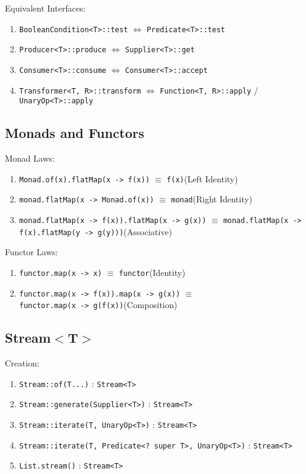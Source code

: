 \documentclass[12pt, a4paper]{article}
\begin{document}
\begin{multicols*}{2}
Equivalent Interfaces:
\begin{enumerate}[\roman*.]
  \item \lstinline|BooleanCondition<T>::test| $\iff$ \lstinline|Predicate<T>::test|
  \item \lstinline|Producer<T>::produce| $\iff$ \lstinline|Supplier<T>::get|
  \item \lstinline|Consumer<T>::consume| $\iff$ \lstinline|Consumer<T>::accept|
  \item \lstinline|Transformer<T, R>::transform| $\iff$ \lstinline|Function<T, R>::apply| /\\
    \quad\quad\quad\quad\quad\quad\quad\quad\quad\quad\quad\quad\quad\quad\quad\quad\quad\quad\quad\quad\lstinline|UnaryOp<T>::apply|
\end{enumerate}

\subsection{Monads and Functors}
Monad Laws:
\begin{enumerate}[\roman*.]
  \item \lstinline|Monad.of(x).flatMap(x -> f(x))| $\equiv$ \lstinline|f(x)|\hfill(Left Identity)
  \item \lstinline|monad.flatMap(x -> Monad.of(x))| $\equiv$ \lstinline|monad|\hfill(Right Identity)
  \item \lstinline|monad.flatMap(x -> f(x)).flatMap(x -> g(x))| $\equiv$ \lstinline|monad.flatMap(x -> f(x).flatMap(y -> g(y)))|\hfill(Associative)
\end{enumerate}

Functor Laws:
\begin{enumerate}[\roman*.]
  \item \lstinline|functor.map(x -> x)| $\equiv$ \lstinline|functor|\hfill(Identity)
  \item \lstinline|functor.map(x -> f(x)).map(x -> g(x))| $\equiv$\\ \lstinline|functor.map(x -> g(f(x))|\hfill(Composition)
\end{enumerate}
\colbreak

\subsection{Stream$<$T$>$}
Creation:
\begin{enumerate}[\roman*.]
  \item \lstinline|Stream::of(T...)| : \lstinline|Stream<T>|
  \item \lstinline|Stream::generate(Supplier<T>)| : \lstinline|Stream<T>|
  \item \lstinline|Stream::iterate(T, UnaryOp<T>)| : \lstinline|Stream<T>|
  \item \lstinline|Stream::iterate(T, Predicate<? super T>, UnaryOp<T>)| : \lstinline|Stream<T>|
  \item \lstinline|List.stream()| : \lstinline|Stream<T>|
\end{enumerate}


\end{multicols*}
\end{document}
